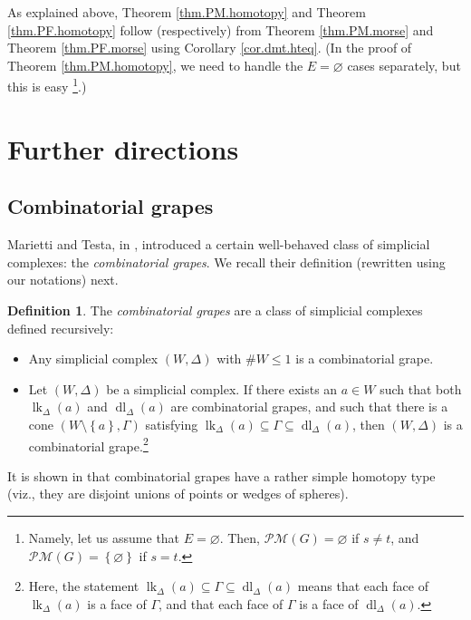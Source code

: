 \documentclass[12pt]{amsart}
\theoremstyle{definition}
\newtheorem{definition}[theorem]{Definition}
\DeclareMathOperator{\lk}{lk}
\DeclareMathOperator{\dl}{dl}
\newcommand{\set}[1]{\left\{ #1 \right\}}
\newcommand{\tup}[1]{\left( #1 \right)}
\newcommand{\Pm}[1]{\mathcal{PM}\left(#1\right)}
\begin{document}
As explained above, Theorem \ref{thm.PM.homotopy} and Theorem
\ref{thm.PF.homotopy} follow (respectively) from Theorem \ref{thm.PM.morse}
and Theorem \ref{thm.PF.morse} using Corollary \ref{cor.dmt.hteq}.
(In the proof of Theorem \ref{thm.PM.homotopy}, we need to handle
the $E = \varnothing$ cases separately, but this is easy%
\footnote{Namely, let us assume that $E = \varnothing$.
Then, $\Pm{G} = \varnothing$ if $s \neq t$, and
$\Pm{G} = \set{\varnothing}$ if $s = t$.}.)



\section{\label{sect.further}Further directions}

\subsection{Combinatorial grapes}

Marietti and Testa, in \cite[Definition 3.2]{MariettiTesta}, introduced a certain well-behaved class of simplicial complexes: the \emph{combinatorial grapes}.
We recall their definition (rewritten using our notations) next.

\begin{definition}
The \emph{combinatorial grapes} are a class of simplicial complexes defined recursively:
\begin{itemize}
\item Any simplicial complex $\tup{W, \Delta}$ with $\# W \leq 1$ is a combinatorial grape.
\item Let $\tup{W, \Delta}$ be a simplicial complex. If there exists an $a \in W$ such that both $\lk_\Delta (a)$ and $\dl_\Delta (a)$ are combinatorial grapes, and such that there is a cone $\tup{W \setminus \set{a}, \Gamma}$ satisfying $\lk_\Delta (a) \subseteq \Gamma \subseteq \dl_\Delta (a)$, then $\tup{W, \Delta}$ is a combinatorial grape.\footnote{Here, the statement $\lk_\Delta (a) \subseteq \Gamma \subseteq \dl_\Delta (a)$ means that each face of $\lk_\Delta (a)$ is a face of $\Gamma$, and that each face of $\Gamma$ is a face of $\dl_\Delta (a)$.}
\end{itemize}
\end{definition}

It is shown in \cite[Proposition 3.3]{MariettiTesta} that combinatorial grapes have a rather simple homotopy type (viz., they are disjoint unions of points or wedges of spheres).
\end{document}
